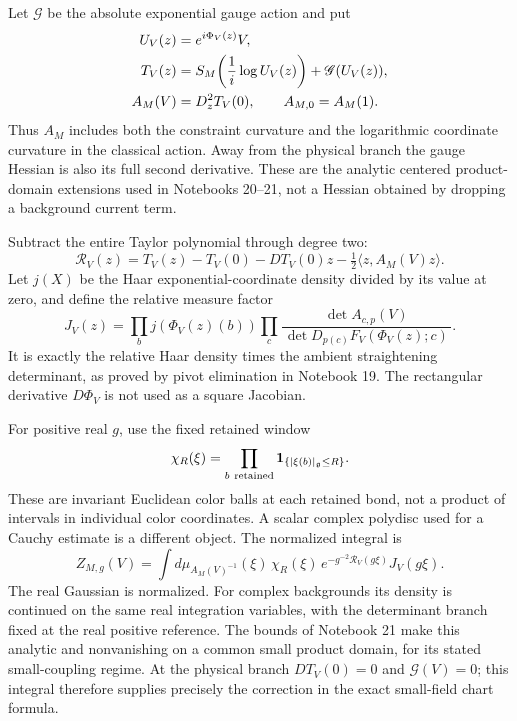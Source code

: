 Let $\mathscr G$ be the absolute exponential gauge action and put
\begin{align}
 U_V(z)&=e^{i\Phi_V(z)}V, \notag\\
 T_V(z)&=S_M\!\left(\frac1i\log U_V(z)\right)
                         +\mathscr G(U_V(z)),             \label{gc-total-action}\\
 A_M(V)&=D_z^2T_V(0),\qquad A_{M,0}=A_M(1).              \label{gc-precision}
\end{align}
Thus $A_M$ includes both the constraint curvature and the logarithmic
coordinate curvature in the classical action. Away from the physical
branch the gauge Hessian is also its full second derivative. These
are the analytic centered product-domain extensions used in
Notebooks 20--21, not a Hessian obtained by dropping a background
current term.

Subtract the entire Taylor polynomial through degree two:
\begin{equation}\label{gc-taylor-remainder}
 \mathcal R_V(z)=T_V(z)-T_V(0)-DT_V(0)z
                           -\tfrac12\langle z,A_M(V)z\rangle.
\end{equation}
Let $j(X)$ be the Haar exponential-coordinate density divided by
its value at zero, and define the relative measure factor
\begin{equation}\label{gc-density}
 J_V(z)=
 \prod_b j(\Phi_V(z)(b))
 \prod_c\frac{\det A_{c,p}(V)}
 {\,\det D_{p(c)}F_V(\Phi_V(z);c)\,}.
\end{equation}
It is exactly the relative Haar density times the ambient
straightening determinant, as proved by pivot elimination in
Notebook 19. The rectangular derivative $D\Phi_V$ is not used as a
square Jacobian.

For positive real $g$, use the fixed retained window
\begin{equation}\label{gc-cutoff}
 \chi_R(\xi)=\prod_{b\ {\rm retained}}
                    \mathbf1_{\{|\xi(b)|_{\mathfrak g}\le R\}}.
\end{equation}
These are invariant Euclidean color balls at each retained bond,
not a product of intervals in individual color coordinates. A scalar
complex polydisc used for a Cauchy estimate is a different object.
The normalized integral is
\begin{equation}\label{gc-normalized-integral}
 Z_{M,g}(V)=\int d\mu_{A_M(V)^{-1}}(\xi)\,
      \chi_R(\xi)\,
      e^{-g^{-2}\mathcal R_V(g\xi)}J_V(g\xi).
\end{equation}
The real Gaussian is normalized. For complex backgrounds its density
is continued on the same real integration variables, with the
determinant branch fixed at the real positive reference. The bounds
of Notebook 21 make this analytic and nonvanishing on a common
small product domain, for its stated small-coupling regime.
At the physical branch $DT_V(0)=0$ and $\mathscr G(V)=0$; this
integral therefore supplies precisely the correction in the exact
small-field chart formula.

